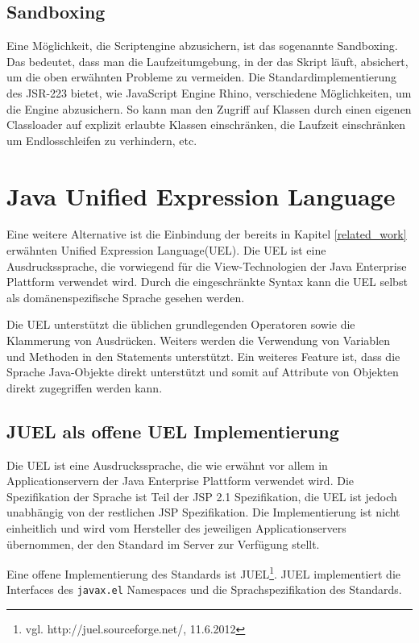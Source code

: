 \subsection{Sandboxing}

Eine Möglichkeit, die Scriptengine abzusichern, ist das sogenannte Sandboxing. Das bedeutet, dass man die Laufzeitumgebung, in der das Skript läuft, absichert, um die oben erwähnten Probleme zu vermeiden. Die Standardimplementierung des JSR-223 bietet, wie JavaScript Engine Rhino, verschiedene Möglichkeiten, um die Engine abzusichern. So kann man den Zugriff auf Klassen durch einen eigenen Classloader auf explizit erlaubte Klassen einschränken\cite{wwwSandboxRhino}, die Laufzeit einschränken um Endlosschleifen zu verhindern, etc.


\section{Java Unified Expression Language}

Eine weitere Alternative ist die Einbindung der bereits in Kapitel \ref{related_work} erwähnten Unified Expression Language(UEL)\cite{UEL}. Die UEL ist eine Ausdruckssprache, die vorwiegend für die View-Technologien der Java Enterprise Plattform verwendet wird. Durch die eingeschränkte Syntax kann die UEL selbst als domänenspezifische Sprache gesehen werden.

Die UEL unterstützt die üblichen grundlegenden Operatoren sowie die Klammerung von Ausdrücken. Weiters werden die Verwendung von Variablen und Methoden in den Statements unterstützt. Ein weiteres Feature ist, dass die Sprache Java-Objekte direkt unterstützt und somit auf Attribute von Objekten direkt zugegriffen werden kann.

\subsection{JUEL als offene UEL Implementierung}

Die UEL ist eine Ausdruckssprache, die wie erwähnt vor allem in Applicationservern der Java Enterprise Plattform verwendet wird. Die Spezifikation der Sprache ist Teil der JSP 2.1 Spezifikation, die UEL ist jedoch unabhängig von der restlichen JSP Spezifikation. Die Implementierung ist nicht einheitlich und wird vom Hersteller des jeweiligen Applicationservers übernommen, der den Standard im Server zur Verfügung stellt.

Eine offene Implementierung des Standards ist JUEL\footnote{vgl. http://juel.sourceforge.net/, 11.6.2012}. JUEL implementiert die Interfaces des \texttt{javax.el} Namespaces und die Sprachspezifikation des Standards.

